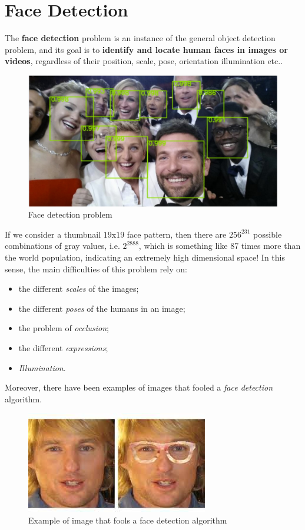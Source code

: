 \section{Face Detection} \label{ch2}

The \textbf{face detection} problem is an instance of the general object detection problem, and its goal is to \textbf{identify and locate human faces in images or videos}, regardless of their position, scale, pose, orientation illumination etc..

\begin{figure}[h!]
		\centering
		\includegraphics[scale = 0.7]{img/face detection.jpg}
        \caption{Face detection problem}
\end{figure}

If we consider a thumbnail $19$x$19$ face pattern, then there are $256^{231}$ possible combinations of gray values, i.e. $2^{2888}$, which is something like 87 times more than the world population, indicating an extremely high dimensional space! In this sense, the main difficulties of this problem rely on:

\begin{itemize}
    \item the different \textit{scales} of the images;
    \item the different \textit{poses} of the humans in an image;
    \item the problem of \textit{occlusion};
    \item the different \textit{expressions};
    \item \textit{Illumination}.
\end{itemize}

Moreover, there have been examples of images that fooled a \textit{face detection} algorithm.

\begin{figure}[h!]
		\centering
		\includegraphics[scale = 0.7]{img/fool.jpeg}
        \caption{Example of image that fools a face detection algorithm}
\end{figure}

